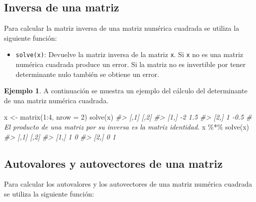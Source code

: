 \documentclass[
]{book}
\newenvironment{Shaded}{\begin{snugshade}}{\end{snugshade}}
\newcommand{\AttributeTok}[1]{\textcolor[rgb]{0.77,0.63,0.00}{#1}}
\newcommand{\CommentTok}[1]{\textcolor[rgb]{0.56,0.35,0.01}{\textit{#1}}}
\newcommand{\DecValTok}[1]{\textcolor[rgb]{0.00,0.00,0.81}{#1}}
\newcommand{\FunctionTok}[1]{\textcolor[rgb]{0.00,0.00,0.00}{#1}}
\newcommand{\NormalTok}[1]{#1}
\newcommand{\OtherTok}[1]{\textcolor[rgb]{0.56,0.35,0.01}{#1}}
\newcommand{\SpecialCharTok}[1]{\textcolor[rgb]{0.00,0.00,0.00}{#1}}
\providecommand{\tightlist}{%
  \setlength{\itemsep}{0pt}\setlength{\parskip}{0pt}}
\theoremstyle{definition}
\theoremstyle{definition}
\newtheorem{example}{Ejemplo}[chapter]
\theoremstyle{definition}
\theoremstyle{definition}
\theoremstyle{remark}
\begin{document}
\hypertarget{inversa-de-una-matriz}{%
\subsection{Inversa de una matriz}\label{inversa-de-una-matriz}}

Para calcular la matriz inversa de una matriz numérica cuadrada se utiliza la siguiente función:

\begin{itemize}
\tightlist
\item
  \texttt{solve(x)}: Devuelve la matriz inversa de la matriz \texttt{x}. Si \texttt{x} no es una matriz numérica cuadrada produce un error. Si la matriz no es invertible por tener determinante nulo también se obtiene un error.
\end{itemize}

\begin{example}

A continuación se muestra un ejemplo del cálculo del determinante de una matriz numérica cuadrada.

\begin{Shaded}
\begin{Highlighting}[]
\NormalTok{x }\OtherTok{\textless{}{-}} \FunctionTok{matrix}\NormalTok{(}\DecValTok{1}\SpecialCharTok{:}\DecValTok{4}\NormalTok{, }\AttributeTok{nrow =} \DecValTok{2}\NormalTok{)}
\FunctionTok{solve}\NormalTok{(x)}
\CommentTok{\#\textgreater{}      [,1] [,2]}
\CommentTok{\#\textgreater{} [1,]   {-}2  1.5}
\CommentTok{\#\textgreater{} [2,]    1 {-}0.5}
\CommentTok{\# El producto de una matriz por su inversa es la matriz identidad.}
\NormalTok{x }\SpecialCharTok{\%*\%} \FunctionTok{solve}\NormalTok{(x)}
\CommentTok{\#\textgreater{}      [,1] [,2]}
\CommentTok{\#\textgreater{} [1,]    1    0}
\CommentTok{\#\textgreater{} [2,]    0    1}
\end{Highlighting}
\end{Shaded}

\end{example}

\hypertarget{autovalores-y-autovectores-de-una-matriz}{%
\subsection{Autovalores y autovectores de una matriz}\label{autovalores-y-autovectores-de-una-matriz}}

Para calcular los autovalores y los autovectores de una matriz numérica cuadrada se utiliza la siguiente función:
\end{document}
